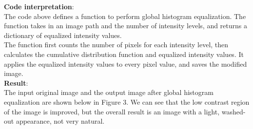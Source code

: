 \documentclass[UTF8]{ctexart}
\begin{document}
\textbf{Code interpretation}:\\
The code above defines a function to perform global histogram equalization. The function takes in an image path and the number of intensity levels, and returns a dictionary of equalized intensity values.\\
The function first counts the number of pixels for each intensity level, then calculates the cumulative distribution function and equalized intensity values. It applies the equalized intensity values to every pixel value, and saves the modified image.\\
\textbf{Result}:\\
The input original image and the output image after global histogram equalization are shown below in Figure 3. We can see that the low contrast region of the image is improved, but the overall result is an image with a light, washed-out appearance, not very natural.\\
\end{document}
